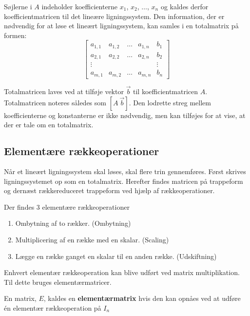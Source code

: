 Søjlerne i $A$ indeholder koefficienterne $x_1$, $x_2$, $\dots $, $x_n$ og kaldes derfor koefficientmatricen til det lineære ligningssystem. 
Den information, der er nødvendig for at løse et lineært ligningssystem, kan samles i en totalmatrix på formen:
\[
\left[
\begin{array}{cccc|c}
a_{1,1} & a_{1,2} & \dots & a_{1,n} & b_1 \\
a_{2,1} & a_{2,2} & \dots & a_{2,n} & b_2 \\
\vdots  &         &       &         & \vdots \\
a_{m,1} & a_{m,2} & \dots & a_{m,n} & b_n
\end{array}
\right]
\]

Totalmatricen laves ved at tilføje vektor $\vec{b}$ til koefficientmatricen $A$. Totalmatricen noteres således som $[A \ \vec{b}]$. Den lodrette streg mellem koefficienterne og konstanterne er ikke nødvendig, men kan tilføjes for at vise, at der er tale om en totalmatrix.\\


\subsection{Elementære rækkeoperationer}
Når et lineært ligningssystem skal løses, skal flere trin gennemføres. Først skrives ligningssystemet op som en totalmatrix. Herefter findes matricen på trappeform og dernæst rækkereduceret trappeform ved hjælp af rækkeoperationer. 

\begin{defn}
Der findes 3 elementære rækkeoperationer
\begin{enumerate}
\item Ombytning af to rækker. (Ombytning)
\item Multiplicering af en række med en skalar. (Scaling)
\item Lægge en række ganget en skalar til en anden række. (Udskiftning)
\end{enumerate}
\label{defn_elemen_operation}
\end{defn}

Enhvert elementær rækkeoperation kan blive udført ved matrix multiplikation. Til dette bruges elementærmatricer.  

\begin{defn}[Elementærmatrix]
En matrix, $E$, kaldes en \textbf{elementærmatrix} hvis den kan opnåes ved at udføre én elementær rækkeoperation på $I_n$ 
\label{def:elematrix}
\end{defn}


